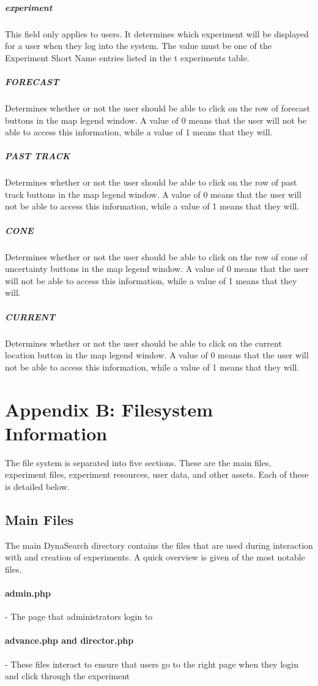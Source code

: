 \documentclass[article]{ij4uq}              %
\begin{document}
\subparagraph{experiment}
This field only applies to users. It determines which experiment will be displayed for a user when they log into the system. The value must be one of the Experiment Short Name entries listed in the t experiments table. 

\subparagraph{FORECAST}
Determines whether or not the user should be able to click on the row of forecast buttons in the map legend window. A value of 0 means that the user will not be able to access this information, while a value of 1 means that they will. 

\subparagraph{PAST TRACK}
Determines whether or not the user should be able to click on the row of past track buttons in the map legend window. A value of 0 means that the user will not be able to access this information, while a value of 1 means that they will. 

\subparagraph{CONE}
Determines whether or not the user should be able to click on the row of cone of uncertainty buttons in the map legend window. A value of 0 means that the user will not be able to access this information, while a value of 1 means that they will. 

\subparagraph{CURRENT}
Determines whether or not the user should be able to click on the current location button in the map legend window. A value of 0 means that the user will not be able to access this information, while a value of 1 means that they will.

\section{Appendix B: Filesystem Information}
The file system is separated into five sections. These are the main files, experiment files, experiment resources, user data, and other assets. Each of these is detailed below.

\subsection{Main Files}
The main DynaSearch directory contains the files that are used during interaction with and creation of experiments. A quick overview is given of the most notable files.

\paragraph{admin.php} - The page that administrators login to

\paragraph{advance.php and director.php} - These files interact to ensure that users go to the right page when they login and click through the experiment
\end{document}
